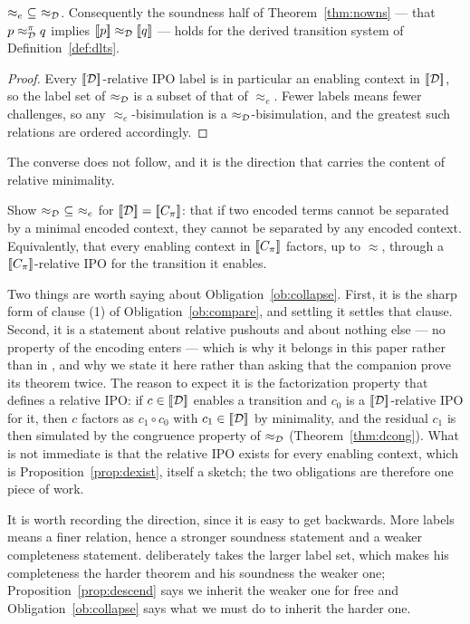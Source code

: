 \documentclass{article}
\begin{document}
\begin{proposition}
\label{prop:descend}
    $\approx_{e}\ \subseteq\ \approx_{\mathcal{D}}$. Consequently the soundness half of Theorem~\ref{thm:nowns} --- that $p\approx_{\mathcal{D}}^{\pi}q$ implies $[\![p]\!]\approx_{\mathcal{D}}[\![q]\!]$ --- holds for the derived transition system of Definition~\ref{def:dlts}.
\end{proposition}
\begin{proof}
    Every $[\![\mathcal{D}]\!]$-relative IPO label is in particular an enabling context in $[\![\mathcal{D}]\!]$, so the label set of $\approx_{\mathcal{D}}$ is a subset of that of $\approx_{e}$. Fewer labels means fewer challenges, so any $\approx_{e}$-bisimulation is a $\approx_{\mathcal{D}}$-bisimulation, and the greatest such relations are ordered accordingly.
\end{proof}

The converse does not follow, and it is the direction that carries the content of relative minimality.

\begin{obligation}
\label{ob:collapse}
    Show $\approx_{\mathcal{D}}\ \subseteq\ \approx_{e}$ for $[\![\mathcal{D}]\!]=[\![C_\pi]\!]$: that if two encoded terms cannot be separated by a minimal encoded context, they cannot be separated by any encoded context. Equivalently, that every enabling context in $[\![C_\pi]\!]$ factors, up to $\approx$, through a $[\![C_\pi]\!]$-relative IPO for the transition it enables.
\end{obligation}

Two things are worth saying about Obligation~\ref{ob:collapse}. First, it is the sharp form of clause (1) of Obligation~\ref{ob:compare}, and settling it settles that clause. Second, it is a statement about relative pushouts and about nothing else --- no property of the encoding enters --- which is why it belongs in this paper rather than in \citep{nowns}, and why we state it here rather than asking that the companion prove its theorem twice. The reason to expect it is the factorization property that defines a relative IPO: if $c\in[\![\mathcal{D}]\!]$ enables a transition and $c_0$ is a $[\![\mathcal{D}]\!]$-relative IPO for it, then $c$ factors as $c_1\circ c_0$ with $c_1\in[\![\mathcal{D}]\!]$ by minimality, and the residual $c_1$ is then simulated by the congruence property of $\approx_{\mathcal{D}}$ (Theorem~\ref{thm:dcong}). What is not immediate is that the relative IPO exists for every enabling context, which is Proposition~\ref{prop:dexist}, itself a sketch; the two obligations are therefore one piece of work.

\begin{remark}
    It is worth recording the direction, since it is easy to get backwards. More labels means a finer relation, hence a stronger soundness statement and a weaker completeness statement.  deliberately takes the larger label set, which makes his completeness the harder theorem and his soundness the weaker one; Proposition~\ref{prop:descend} says we inherit the weaker one for free and Obligation~\ref{ob:collapse} says what we must do to inherit the harder one.
\end{remark}
\end{document}
